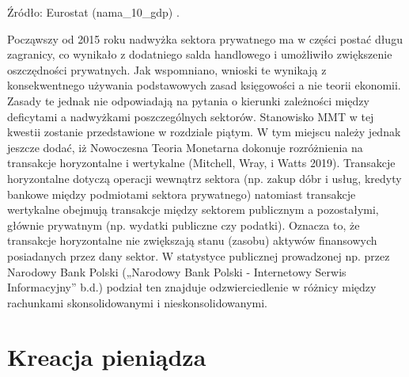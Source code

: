 \documentclass[
]{book}
\begin{document}
Źródło: Eurostat (nama\_10\_gdp) .

Począwszy od 2015 roku nadwyżka sektora prywatnego ma w części postać długu zagranicy, co wynikało z dodatniego salda handlowego i umożliwiło zwiększenie oszczędności prywatnych. Jak wspomniano, wnioski te wynikają z konsekwentnego używania podstawowych zasad księgowości a nie teorii ekonomii. Zasady te jednak nie odpowiadają na pytania o kierunki zależności między deficytami a nadwyżkami poszczególnych sektorów. Stanowisko MMT w tej kwestii zostanie przedstawione w rozdziale piątym. W tym miejscu należy jednak jeszcze dodać, iż Nowoczesna Teoria Monetarna dokonuje rozróżnienia na transakcje horyzontalne i wertykalne (Mitchell, Wray, i Watts 2019). Transakcje horyzontalne dotyczą operacji wewnątrz sektora (np. zakup dóbr i usług, kredyty bankowe między podmiotami sektora prywatnego) natomiast transakcje wertykalne obejmują transakcje między sektorem publicznym a pozostałymi, głównie prywatnym (np. wydatki publiczne czy podatki). Oznacza to, że transakcje horyzontalne nie zwiększają stanu (zasobu) aktywów finansowych posiadanych przez dany sektor. W statystyce publicznej prowadzonej np. przez Narodowy Bank Polski („Narodowy Bank Polski - Internetowy Serwis Informacyjny'' b.d.) podział ten znajduje odzwierciedlenie w różnicy między rachunkami skonsolidowanymi i nieskonsolidowanymi.

\hypertarget{kreacja-pieniux105dza}{%
\section{Kreacja pieniądza}\label{kreacja-pieniux105dza}}
\end{document}
